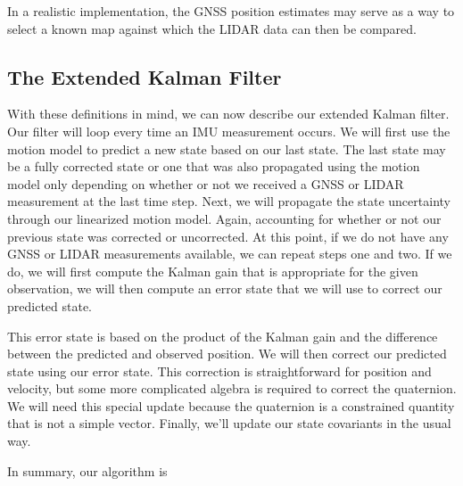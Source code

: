 In a realistic implementation, the GNSS position estimates may serve as a way to select a known map against which
the LIDAR data can then be compared. 

\subsection{The Extended Kalman Filter}

With these definitions in mind, we can now describe our extended
Kalman filter. Our filter will loop every time an IMU measurement occurs. We will first use the
motion model to predict a new state based on our last state. The last state may be a fully corrected state or one that was
also propagated using the motion model only depending on whether or not we received a GNSS or
LIDAR measurement at the last time step. Next, we will propagate the state uncertainty through our linearized
motion model. Again, accounting for whether or not our previous state was corrected or uncorrected. At this point,
if we do not have any GNSS or LIDAR measurements available, we can repeat
steps one and two. If we do, we will first compute the Kalman gain that is appropriate for the given observation, we will then compute
an error state that we will use to correct our predicted state. 

This error state is based on the product of
the Kalman gain and the difference between the predicted and
observed position. We will then correct our predicted state
using our error state. This correction is
straightforward for position and velocity, but some more
complicated algebra is required to correct
the quaternion. We will need
this special update because the quaternion is a constrained
quantity that is not a simple vector. 
Finally, we'll update our state covariants in the usual way. 

In summary, our algorithm is

